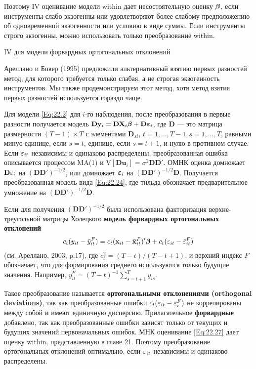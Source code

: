Поэтому IV оценивание модели within дает несостоятельную оценку $\bm{\beta}$, если инструменты слабо экзогенны или удовлетворяют более слабому предположению об одновременной экзогенности или условию в виде суммы. Если инструменты строго экзогенны, можно использовать только преобразование within.

{\centering  IV для модели форвардных ортогональных отклонений }

Ареллано и Бовер (1995) предложили альтернативный взятию первых разностей метод, для которого требуется только слабая, а не строгая экзогенность инструментов. Мы также продемонстрируем этот метод, хотя метод взятия первых разностей используется гораздо чаще.

Для модели \ref{Eq:22.2}  для $i$-го наблюдения, после преобразования в первые разности получается модель $\mathbf D \mathbf y_i=\mathbf D \mathbf X_i \bm{\beta} + \mathbf D \bm{\varepsilon}_i$, где $\mathbf D$ --- это матрица размерности $(T-1) \times T$ с элементами $\mathbf D_{st}$, $t=1, \dots, T-1, s=1, \dots, T$, равными минус единице, если  $s=t$, единице, если $s=t+1$, и нулю в противном случае. Если $\varepsilon_{it}$ независимы и одинаково распределены, преобразованная ошибка описывается процессом MA(1)  и $\mathrm{V}[\mathbf D \mathbf u_i]=\sigma^2 \mathbf D \mathbf D'$. ОМНК оценка домножает $\mathbf D \mathbf {\varepsilon}_i$ на $(\mathbf D \mathbf D')^{-1/2}$, или домножает $\bm{\varepsilon}_i$ на $(\mathbf D \mathbf D')^{-1/2} \mathbf D$. Получается преобразованная модель  вида \ref{Eq:22.24}, где тильда обозначает предварительное умножение на $(\mathbf D \mathbf D')^{-1/2} \mathbf D$.

Если для получения $(\mathbf D \mathbf D')^{-1/2}$ была использована факторизация верхне-треугольной матрицы Холецкого  \textbf{модель форвардных ортогональных отклонений}
\begin{align}
c_t(y_{it}-\bar{y}^F_{it})=c_t(\mathbf{x}_{it}-\bar{\mathbf{x}}_{it}^F)'\bm{\beta} + c_t (\varepsilon_{it} - \bar{\varepsilon}^F_{it})
\label{Eq:22.27}
\end{align}
(см. Ареллано, 2003, p.17), где $c^2_t=(T-t)/(T-t+1)$, и верхний индекс $F$ обозначает, что для формирования среднего используются только будущие значения. Например, $\bar{y}^F_{it}=(T-t)^{-1} \sum^T_{s=t+1} y_{is}$.

Такое преобразование называется \textbf{ортогональными отклонениями (orthogonal deviations)}, так как преобразованные ошибки $c_t(\varepsilon_{it}-\bar{\varepsilon}_i^F)$ не коррелированы между собой и имеют единичную дисперсию. Прилагательное \textbf{форвардные} добавлено, так как преобразованные ошибки зависят только от текущих и будущих значений первоначальных ошибок. МНК оценивание \ref{Eq:22.27} дает оценку within, представленную в главе 21. Поэтому преобразование ортогональных отклонений оптимально, если $\varepsilon_{it}$ независимы и одинаково распределены.

